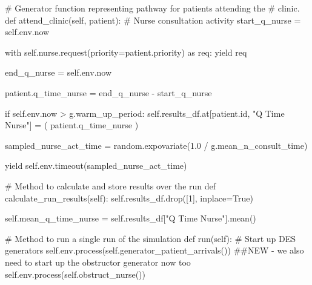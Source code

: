 \documentclass[
  letterpaper,
  DIV=11,
  numbers=noendperiod]{scrreprt}
\newenvironment{Shaded}{\begin{snugshade}}{\end{snugshade}}
\newcommand{\BuiltInTok}[1]{\textcolor[rgb]{0.00,0.23,0.31}{#1}}
\newcommand{\CommentTok}[1]{\textcolor[rgb]{0.37,0.37,0.37}{#1}}
\newcommand{\ControlFlowTok}[1]{\textcolor[rgb]{0.00,0.23,0.31}{#1}}
\newcommand{\DecValTok}[1]{\textcolor[rgb]{0.68,0.00,0.00}{#1}}
\newcommand{\FloatTok}[1]{\textcolor[rgb]{0.68,0.00,0.00}{#1}}
\newcommand{\ImportTok}[1]{\textcolor[rgb]{0.00,0.46,0.62}{#1}}
\newcommand{\KeywordTok}[1]{\textcolor[rgb]{0.00,0.23,0.31}{#1}}
\newcommand{\NormalTok}[1]{\textcolor[rgb]{0.00,0.23,0.31}{#1}}
\newcommand{\OperatorTok}[1]{\textcolor[rgb]{0.37,0.37,0.37}{#1}}
\newcommand{\StringTok}[1]{\textcolor[rgb]{0.13,0.47,0.30}{#1}}
\newcommand{\VariableTok}[1]{\textcolor[rgb]{0.07,0.07,0.07}{#1}}
\begin{document}
\begin{Shaded}
\begin{Highlighting}[]
    \CommentTok{\# Generator function representing pathway for patients attending the}
    \CommentTok{\# clinic.}
    \KeywordTok{def}\NormalTok{ attend\_clinic(}\VariableTok{self}\NormalTok{, patient):}
        \CommentTok{\# Nurse consultation activity}
\NormalTok{        start\_q\_nurse }\OperatorTok{=} \VariableTok{self}\NormalTok{.env.now}

        \ControlFlowTok{with} \VariableTok{self}\NormalTok{.nurse.request(priority}\OperatorTok{=}\NormalTok{patient.priority) }\ImportTok{as}\NormalTok{ req:}
            \ControlFlowTok{yield}\NormalTok{ req}

\NormalTok{            end\_q\_nurse }\OperatorTok{=} \VariableTok{self}\NormalTok{.env.now}

\NormalTok{            patient.q\_time\_nurse }\OperatorTok{=}\NormalTok{ end\_q\_nurse }\OperatorTok{{-}}\NormalTok{ start\_q\_nurse}

            \ControlFlowTok{if} \VariableTok{self}\NormalTok{.env.now }\OperatorTok{\textgreater{}}\NormalTok{ g.warm\_up\_period:}
                \VariableTok{self}\NormalTok{.results\_df.at[patient.}\BuiltInTok{id}\NormalTok{, }\StringTok{"Q Time Nurse"}\NormalTok{] }\OperatorTok{=}\NormalTok{ (}
\NormalTok{                    patient.q\_time\_nurse}
\NormalTok{                )}

\NormalTok{            sampled\_nurse\_act\_time }\OperatorTok{=}\NormalTok{ random.expovariate(}\FloatTok{1.0} \OperatorTok{/}
\NormalTok{                                                        g.mean\_n\_consult\_time)}

            \ControlFlowTok{yield} \VariableTok{self}\NormalTok{.env.timeout(sampled\_nurse\_act\_time)}

    \CommentTok{\# Method to calculate and store results over the run}
    \KeywordTok{def}\NormalTok{ calculate\_run\_results(}\VariableTok{self}\NormalTok{):}
        \VariableTok{self}\NormalTok{.results\_df.drop([}\DecValTok{1}\NormalTok{], inplace}\OperatorTok{=}\VariableTok{True}\NormalTok{)}

        \VariableTok{self}\NormalTok{.mean\_q\_time\_nurse }\OperatorTok{=} \VariableTok{self}\NormalTok{.results\_df[}\StringTok{"Q Time Nurse"}\NormalTok{].mean()}

    \CommentTok{\# Method to run a single run of the simulation}
    \KeywordTok{def}\NormalTok{ run(}\VariableTok{self}\NormalTok{):}
        \CommentTok{\# Start up DES generators}
        \VariableTok{self}\NormalTok{.env.process(}\VariableTok{self}\NormalTok{.generator\_patient\_arrivals())}
        \CommentTok{\#\#NEW {-} we also need to start up the obstructor generator now too}
        \VariableTok{self}\NormalTok{.env.process(}\VariableTok{self}\NormalTok{.obstruct\_nurse())}


\end{Highlighting}
\end{Shaded}
\end{document}

